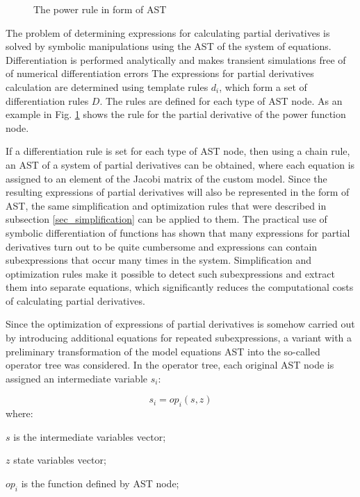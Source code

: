\documentclass[lettersize,journal]{IEEEtran}
\begin{document}
\begin{figure}[h]
	\centering
	\caption{The power rule in form of AST}
	\label{fig_dpower}
\end{figure}

The problem of determining expressions for calculating partial derivatives is solved by symbolic manipulations using the AST of the system of equations.
Differentiation is performed analytically and makes transient simulations free of of numerical differentiation errors 
The expressions for partial derivatives calculation are determined using template rules \(d_i\), which form a set of differentiation 
rules \(D\). The rules are defined for each type of AST node. As an example in Fig. \ref{fig_dpower} shows the rule for the partial 
derivative of the power function node.

If a differentiation rule is set for each type of AST node, then using a chain rule, an AST of a system of partial derivatives can be
obtained, where each equation is assigned to an element of the Jacobi matrix of the custom model. Since the resulting expressions of partial 
derivatives will also be represented in the form of AST, the same simplification and optimization rules that were described in 
subsection \ref{sec_simplification} can be applied to them. The practical use of symbolic differentiation of functions has shown that many 
expressions for partial derivatives turn out to be quite cumbersome and expressions can contain subexpressions that occur many times in the system. 
Simplification and optimization rules make it possible to detect such subexpressions and extract them into separate equations, which significantly
reduces the computational costs of calculating partial derivatives.

Since the optimization of expressions of partial derivatives is somehow carried out by introducing additional equations for repeated subexpressions,
a variant with a preliminary transformation of the model equations AST into the so-called operator tree was considered. In the operator tree, 
each original AST node is assigned an intermediate variable \(s_i\):

\begin{equation}
	\label{eqn_opthree}
	s_i=op_i(s,z)
\end{equation}
\noindent where:
\begin{description}
	\item  \(s\) is the intermediate variables vector;
	\item  \(z\) state variables vector;
	\item  \(op_i\) is the function defined by AST node;
\end{description}
\end{document}
